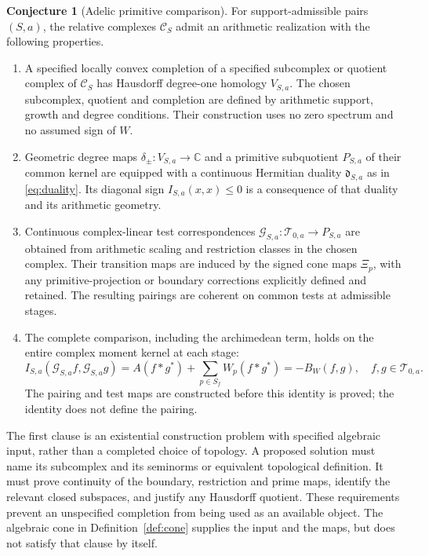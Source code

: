 \documentclass[11pt,letterpaper]{article}
\theoremstyle{definition}
\newtheorem{conjecture}[theorem]{Conjecture}
\theoremstyle{remark}
\newcommand{\C}{\mathbb C}
\newcommand{\T}{\mathcal T}
\begin{document}
\begin{conjecture}[Adelic primitive comparison]\label{conj:primitive}
For support-admissible pairs $(S,a)$, the relative complexes
$\mathscr C_S$ admit an arithmetic realization with the following
properties.
\begin{enumerate}
 \item A specified locally convex completion of a specified
 subcomplex or quotient complex of $\mathscr C_S$ has Hausdorff
 degree-one homology $V_{S,a}$. The chosen subcomplex, quotient
 and completion are defined by arithmetic support, growth and
 degree conditions. Their construction uses no zero spectrum
 and no assumed sign of $W$.
 \item Geometric degree maps $\delta_\pm:V_{S,a}\to\C$ and a
 primitive subquotient $P_{S,a}$ of their common kernel are
 equipped with a continuous Hermitian duality
 $\mathfrak d_{S,a}$ as in \eqref{eq:duality}. Its diagonal sign
 $I_{S,a}(x,x)\le0$ is a consequence of that duality and its
 arithmetic geometry.
 \item Continuous complex-linear test correspondences
 $\mathcal G_{S,a}:\T_{0,a}\to P_{S,a}$ are obtained from
 arithmetic scaling and restriction classes in the chosen
 complex. Their transition maps are induced by the signed cone
 maps $\Xi_p$, with any primitive-projection or boundary
 corrections explicitly defined and retained. The resulting
 pairings are coherent on common tests at admissible stages.
 \item The complete comparison, including the archimedean
 term, holds on the entire complex moment kernel at each stage:
 \begin{equation}
 I_{S,a}(\mathcal G_{S,a}f,\mathcal G_{S,a}g)
       =A(f*g^*)+\sum_{p\in S_f}W_p(f*g^*)
       =-B_W(f,g),\quad f,g\in\T_{0,a}.
 \label{eq:primitive-comparison}
 \end{equation}
 The pairing and test maps are constructed before this identity
 is proved; the identity does not define the pairing.
\end{enumerate}
\end{conjecture}

The first clause is an existential construction problem with
specified algebraic input, rather than a completed choice of
topology. A proposed solution must name its subcomplex and its
seminorms or equivalent topological definition. It must prove
continuity of the boundary, restriction and prime maps, identify
the relevant closed subspaces, and justify any Hausdorff quotient.
These requirements prevent an unspecified completion from being
used as an available object. The algebraic cone in
Definition~\ref{def:cone} supplies the input and the maps, but
does not satisfy that clause by itself.
\end{document}
